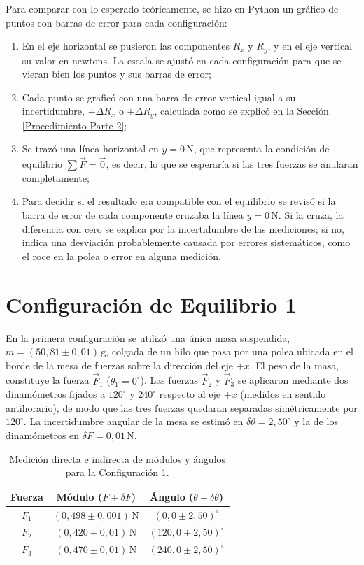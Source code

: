\documentclass[12pt,a4paper]{article}
\begin{document}
Para comparar con lo esperado teóricamente, se hizo en Python un gráfico de puntos con barras de error para cada configuración:

\begin{enumerate}[label=\alph*)]
\item En el eje horizontal se pusieron las componentes $R_x$ y $R_y$, y en el eje vertical su valor en newtons. La escala se ajustó en cada configuración para que se vieran bien los puntos y sus barras de error;
\item Cada punto se graficó con una barra de error vertical igual a su incertidumbre, $\pm\Delta R_x$ o $\pm\Delta R_y$, calculada como se explicó en la Sección \ref{Procedimiento-Parte-2};
\item Se trazó una línea horizontal en $y = 0\,\mathrm{N}$, que representa la condición de equilibrio $\sum \vec{F} = \vec{0}$, es decir, lo que se esperaría si las tres fuerzas se anularan completamente;
\item Para decidir si el resultado era compatible con el equilibrio se revisó si la barra de error de cada componente cruzaba la línea $y = 0\,\mathrm{N}$. Si la cruza, la diferencia con cero se explica por la incertidumbre de las mediciones; si no, indica una desviación probablemente causada por errores sistemáticos, como el roce en la polea o error en alguna medición.
\end{enumerate}

\newpage
\section{Configuración de Equilibrio 1}

En la primera configuración se utilizó una única masa suspendida, $m = (50{,}81 \pm 0{,}01)\,\mathrm{g}$, colgada de un hilo que pasa por una polea ubicada en el borde de la mesa de fuerzas sobre la dirección del eje $+x$. El peso de la masa, constituye la fuerza $\vec{F}_1$ ($\theta_1 = 0^\circ$). Las fuerzas $\vec{F}_2$ y $\vec{F}_3$ se aplicaron mediante dos dinamómetros fijados a $120^\circ$ y $240^\circ$ respecto al eje $+x$ (medidos en sentido antihorario), de modo que las tres fuerzas quedaran separadas simétricamente por $120^\circ$. La incertidumbre angular de la mesa se estimó en $\delta\theta = 2{,}50^\circ$ y la de los dinamómetros en $\delta F = 0{,}01\,\mathrm{N}$.

\begin{table}[h!]
\centering
\begin{tabular}{|c|c|c|}
\hline
\textbf{Fuerza} & \textbf{Módulo ($F \pm \delta F$)} & \textbf{Ángulo ($\theta \pm \delta \theta$)} \\ \hline
$F_1$ & $(0{,}498 \pm 0{,}001)\,\mathrm{N}$ & $(0{,}0 \pm 2{,}50)^\circ$ \\ \hline
$F_2$ & $(0{,}420 \pm 0{,}01)\,\mathrm{N}$ & $(120{,}0 \pm 2{,}50)^\circ$ \\ \hline
$F_3$ & $(0{,}470 \pm 0{,}01)\,\mathrm{N}$ & $(240{,}0 \pm 2{,}50)^\circ$ \\ \hline
\end{tabular}
\caption{Medición directa e indirecta de módulos y ángulos para la Configuración 1.}
\label{tab:config1-mediciones}
\end{table}
\end{document}
